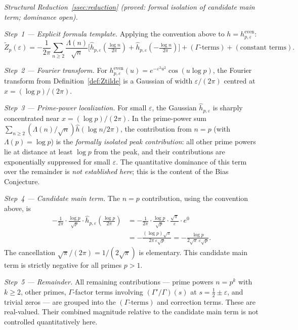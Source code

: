 \documentclass[11pt]{article}
\newcommand{\Zt}{\widetilde{Z}}
\begin{document}
\textit{Structural Reduction~\ref{ssec:reduction}
(proved: formal isolation of candidate main term; dominance open).}

\medskip

\textit{Step~1 --- Explicit formula template.}
Applying the convention above to $h=h^{\mathrm{even}}_{p,\varepsilon}$:
\[
\Zt_p(\varepsilon)
  = -\frac{1}{2\pi}\sum_{n\geq 2}\frac{\Lambda(n)}{\sqrt{n}}
    \bigl[\hat{h}_{p,\varepsilon}({\textstyle\tfrac{\log n}{2\pi}})
    + \hat{h}_{p,\varepsilon}({-\textstyle\tfrac{\log n}{2\pi}})\bigr]
  + (\Gamma\text{-terms}) + (\text{constant terms}).
\]

\textit{Step~2 --- Fourier transform.}
For $h^{\mathrm{even}}_{p,\varepsilon}(u)=e^{-\varepsilon^2 u^2}\cos(u\log p)$,
the Fourier transform from Definition~\ref{def:Ztilde} is
a Gaussian of width $\varepsilon/(2\pi)$ centred at $x=(\log p)/(2\pi)$.

\textit{Step~3 --- Prime-power localization.}
For small $\varepsilon$, the Gaussian $\hat{h}_{p,\varepsilon}$ is
sharply concentrated near $x=(\log p)/(2\pi)$.
In the prime-power sum $\sum_{n\geq 2}(\Lambda(n)/\sqrt{n})\hat{h}(\log n/2\pi)$,
the contribution from $n=p$ (with $\Lambda(p)=\log p$) is the
\textit{formally isolated peak contribution}: all other prime powers lie
at distance at least $\log p$ from the peak, and their contributions
are exponentially suppressed for small $\varepsilon$.
The quantitative dominance of this term over the remainder is
\textit{not established here}; this is the content of the
Bias Conjecture.

\textit{Step~4 --- Candidate main term.}
The $n=p$ contribution, using the convention above, is
\begin{align*}
-\frac{1}{2\pi}\cdot\frac{\log p}{\sqrt{p}}\cdot\hat{h}_{p,\varepsilon}
  \!\left(\tfrac{\log p}{2\pi}\right)
&= -\frac{1}{2\pi}\cdot\frac{\log p}{\sqrt{p}}\cdot\frac{\sqrt{\pi}}{\varepsilon}
   \cdot e^0 \\
&= -\frac{(\log p)\sqrt{\pi}}{2\pi\,\varepsilon\sqrt{p}}
 = -\frac{\log p}{2\sqrt{\pi}\,\varepsilon\sqrt{p}}.
\end{align*}
The cancellation $\sqrt{\pi}/(2\pi)=1/(2\sqrt{\pi})$ is elementary.
This candidate main term is strictly negative for all primes $p>1$.

\textit{Step~5 --- Remainder.}
All remaining contributions --- prime powers $n=p^k$ with $k\geq 2$,
other primes, $\Gamma$-factor terms involving $(\Gamma'/\Gamma)(s)$
at $s=\tfrac{1}{2}\pm\varepsilon$, and trivial zeros --- are grouped into
the $(\Gamma\text{-terms})$ and correction terms.
These are real-valued.
Their combined magnitude relative to the candidate main term
is not controlled quantitatively here.
\end{document}
